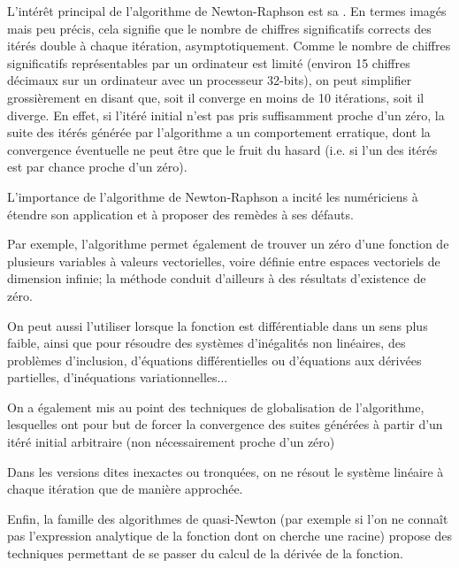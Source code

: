 \medskip
L'intérêt principal de l'algorithme de Newton-Raphson est sa . 
En termes imagés mais peu précis, cela signifie que le nombre de chiffres significatifs corrects des itérés double à chaque itération, asymptotiquement. 
Comme le nombre de chiffres significatifs représentables par un ordinateur est limité (environ 15 chiffres décimaux sur un ordinateur avec un processeur 32-bits), on peut simplifier grossièrement en disant que, soit il converge en moins de 10 itérations, soit il diverge. En effet, si l'itéré initial n'est pas pris suffisamment proche d'un zéro, la suite des itérés générée par l'algorithme a un comportement erratique, dont la convergence éventuelle ne peut être que le fruit du hasard (i.e. si l'un des itérés est par chance proche d'un zéro).

\medskip
L'importance de l'algorithme de Newton-Raphson a incité les numériciens à étendre son application et à proposer des remèdes à ses défauts. 

Par exemple, l'algorithme permet également de trouver un zéro d'une fonction de plusieurs variables à valeurs vectorielles, voire définie entre espaces vectoriels de dimension infinie; la méthode conduit d'ailleurs à des résultats d'existence de zéro. 

On peut aussi l'utiliser lorsque la fonction est différentiable dans un sens plus faible, ainsi que pour résoudre des systèmes d'inégalités non linéaires, des problèmes d'inclusion, d'équations différentielles ou d'équations aux dérivées partielles, d'inéquations variationnelles...

On a également mis au point des techniques de globalisation de l'algorithme, lesquelles ont pour but de forcer la convergence des suites générées à partir d'un itéré initial arbitraire (non nécessairement proche d'un zéro)

Dans les versions dites inexactes ou tronquées, on ne résout le système linéaire à chaque itération que de manière approchée. 

Enfin, la famille des algorithmes de quasi-Newton (par exemple si l'on ne connaît pas l'expression analytique de la fonction dont on cherche une racine) propose des techniques permettant de se passer du calcul de la dérivée de la fonction. 

